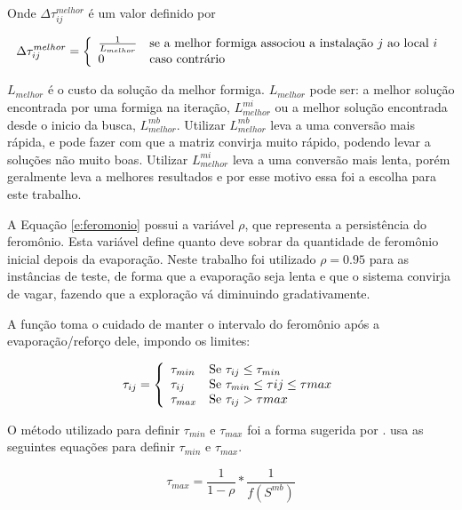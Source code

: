 Onde $\Delta \tau_{ij}^{melhor}$ é um valor definido por

\[
\Delta \tau_{ij}^{melhor} = \left\{
    \begin{array}{l l}
        \frac{1}{L_{melhor}} & \text{se a melhor formiga associou a instalação $j$ ao local $i$}\\
        0 & \text{caso contrário}\\
    \end{array}\right.
\]

$L_{melhor}$ é o custo da solução da melhor formiga. $L_{melhor}$ pode ser:
a melhor solução encontrada por uma formiga na iteração, $L_{melhor}^{mi}$
ou a melhor solução encontrada desde o inicio da busca, $L_{melhor}^{mb}$.
Utilizar $L_{melhor}^{mb}$ leva a uma conversão mais rápida, e pode fazer
com que a matriz convirja muito rápido, podendo levar a soluções não
muito boas.  Utilizar $L_{melhor}^{mi}$ leva a uma conversão mais lenta,
porém geralmente leva a melhores resultados \cite{aco-origin} e por esse
motivo essa foi a escolha para este trabalho.

A Equação \ref{e:feromonio} possui a variável $\rho$, que representa a
persistência do feromônio. Esta variável define quanto deve sobrar da
quantidade de feromônio inicial depois da evaporação. Neste trabalho foi
utilizado $\rho = 0.95$ para as instâncias de teste, de forma que a
evaporação seja lenta e que o sistema convirja de vagar, fazendo que a
exploração vá diminuindo gradativamente.

A função  toma o cuidado de manter o intervalo do
feromônio após a evaporação/reforço dele, impondo os limites:

\begin{equation}
\tau_{ij} = \left\{
    \begin{array}{l l}
        \tau_{min} & \text{Se } \tau_{ij} \leq \tau_{min}\\
        \tau_{ij} & \text{Se } \tau_{min} \leq \tau{ij} \le \tau{max}\\
        \tau_{max} & \text{Se } \tau_{ij} > \tau{max}
    \end{array} \right.
\end{equation}

O método utilizado para definir $\tau_{min}$ e $\tau_{max}$ foi a forma
sugerida por \cite{mmax-origin}. \cite{mmax-origin} usa as seguintes equações
para definir $\tau_{min}$ e $\tau_{max}$.

\begin{equation}
       \tau_{max} = \frac{1}{1-\rho}* \frac{1}{f(S^{mb})}
\end{equation}

